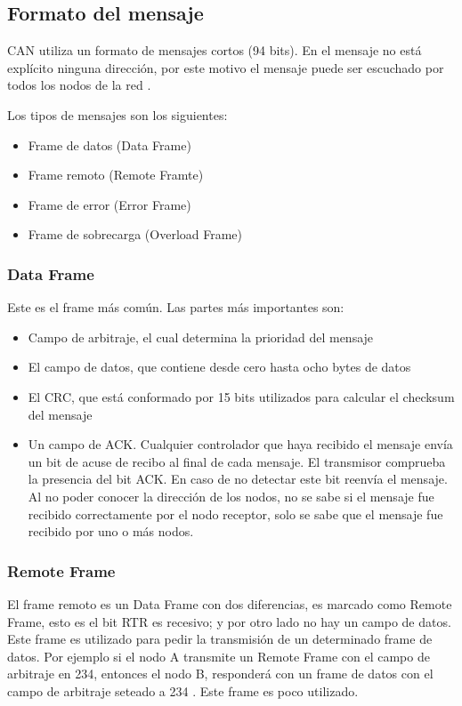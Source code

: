 \subsection{Formato del mensaje}\label{subsec:formato_mensaje}
CAN utiliza un formato de mensajes cortos (94 bits). En el mensaje no está explícito ninguna dirección, por este motivo el mensaje puede ser escuchado por todos los nodos de la red \citep{kvaserWEB}.

Los tipos de mensajes son los siguientes:
\begin{itemize}
    \item Frame de datos (Data Frame)
    \item Frame remoto (Remote Framte)
    \item Frame de error (Error Frame)
    \item Frame de sobrecarga (Overload Frame)
\end{itemize}

\subsubsection{Data Frame}
Este es el frame más común. Las partes más importantes son:

\begin{itemize}
\item Campo de arbitraje, el cual determina la prioridad del mensaje
\item El campo de datos, que contiene desde cero hasta ocho bytes de datos
\item El CRC, que está conformado por 15 bits utilizados para calcular el checksum del mensaje
\item Un campo de ACK. Cualquier controlador que haya recibido el mensaje envía un bit de acuse de recibo al final de cada mensaje. El transmisor comprueba la presencia del bit ACK. En caso de no detectar este bit reenvía el mensaje. Al no poder conocer la dirección de los nodos, no se sabe si el mensaje fue recibido correctamente por el nodo receptor, solo se sabe que el mensaje fue recibido por uno o más nodos.
\end{itemize}

\subsubsection{Remote Frame}
El frame remoto es un Data Frame con dos diferencias, es marcado como Remote Frame, esto es el bit RTR es recesivo; y por otro lado no hay un campo de datos. Este frame es utilizado para pedir la transmisión de un determinado frame de datos. Por ejemplo si el nodo A transmite un Remote Frame con el campo de arbitraje en 234, entonces el nodo B, responderá con un frame de datos con el campo de arbitraje seteado a 234 \citep{kvaserWEB}. Este frame es poco utilizado.

